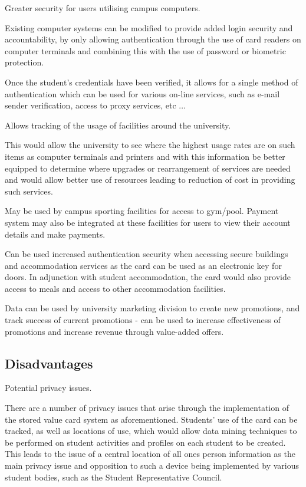 \items Greater security for users utilising campus computers.

Existing computer systems can be modified to provide added login security and
accountability, by only allowing authentication through the use of card readers
on computer terminals and combining this with the use of password or biometric
protection. \cite{irwin}

Once the student's credentials have been verified, it allows for a single
method of authentication which can be used for various on-line services, such
as e-mail sender verification, access to proxy services, etc $\ldots$

\items Allows tracking of the usage of facilities around the university. 	

This would allow the university to see where the highest usage rates are on
such items as computer terminals and printers and with this information be
better equipped to determine where upgrades or rearrangement of services are
needed and would allow better use of resources leading to reduction of cost in
providing such services.

May be used by campus sporting facilities for access to gym/pool. Payment
system may also be integrated at these facilities for users to view their
account details and make payments.

Can be used increased authentication security when accessing secure buildings
and accommodation services as the card can be used as an electronic key for
doors. In adjunction with student accommodation, the card would also provide
access to meals and access to other accommodation facilities. 

Data can be used by university marketing division to create new promotions, and
track success of current promotions - can be used to increase effectiveness of
promotions and increase revenue through value-added offers. \cite{fms}

\subsection{Disadvantages}

\items Potential privacy issues.

There are a number of privacy issues that arise through the implementation of
the stored value card system as aforementioned. Students' use of the card can be
tracked, as well as locations of use, which would allow data mining techniques
to be performed on student activities and profiles on each student to be
created. This leads to the issue of a central location of all ones person
information as the main privacy issue and opposition to such a device being
implemented by various student bodies, such as the Student Representative
Council.

